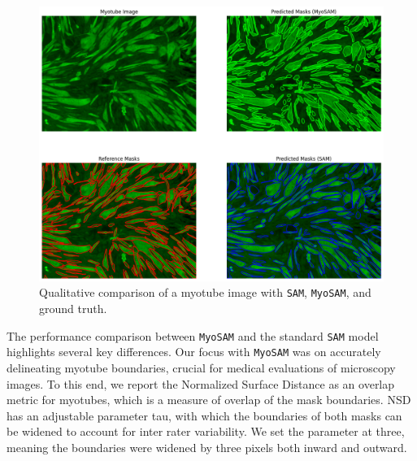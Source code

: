 \begin{figure}
	\centering
	\includegraphics[width=\textwidth]{"images/qualitative_performance_myosam.png"}
	\caption[Qualitative performance \texttt{MyoSAM}]{Qualitative comparison of a myotube image with \texttt{SAM}, \texttt{MyoSAM}, and ground truth.}
	\label{figperfsamqual}
\end{figure} 
The performance comparison between \texttt{MyoSAM} and the standard \texttt{SAM} model highlights several key differences. Our focus with \texttt{MyoSAM} was on accurately delineating myotube boundaries, crucial for medical evaluations of microscopy images. To this end, we report the Normalized Surface Distance as an overlap metric for myotubes, which is a measure of overlap of the mask boundaries. NSD has an adjustable parameter tau, with which the boundaries of both masks can be widened to account for inter rater variability. We set the parameter at three, meaning the boundaries were widened by three pixels both inward and outward.
